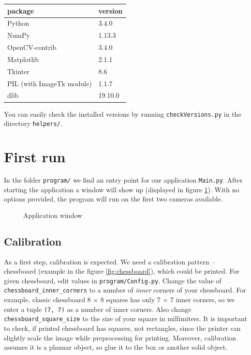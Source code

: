 \begin{center}
\begin{tabular}{l l}
	package	&	version 	\\ \hline
	Python	&	3.4.0 		\\
	NumPy	&	1.13.3 		\\
	OpenCV-contrib	&	3.4.0 	\\ 
	Matplotlib &	2.1.1 		\\
	Tkinter	&	8.6 		\\
	PIL (with ImageTk module)	&	1.1.7 		\\
	dlib	&	19.10.0
\end{tabular}
\end{center}

You can easily check the installed versions by running \verb+checkVersions.py+ in
the directory \verb+helpers/+.

\section{First run}

In the folder \verb+program/+ we find an entry point for our application
\verb+Main.py+. After starting the application a window will show up (displayed
in figure \ref{fig:application}). With no options provided, the program will
run on the first two cameras available.

\begin{figure}
	\caption{Application window}
	\label{fig:application}
\end{figure}

\subsection{Calibration}
As a first step, calibration is expected. We need a calibration pattern --
chessboard (example in the figure \ref{fig:chessboard}), which could be
printed. For given chessboard, edit values in \verb+program/Config.py+. Change
the value of \verb+chessboard_inner_corners+ to a number of \emph{inner}
corners of your chessboard. For example, classic chessboard 8 $\times$ 8
squares has only 7 $\times$ 7 inner corners, so we enter a tuple \verb+(7, 7)+
as a number of inner corners. Also change \verb+chessboard_square_size+ to the
size of your square in millimiters. It is important to check, if printed
chessboard has squares, not rectangles, since the printer can slightly scale
the image while preprocessing for printing.  Moreover, calibration assumes it
is a plannar object, so glue it to the box or another solid object.

